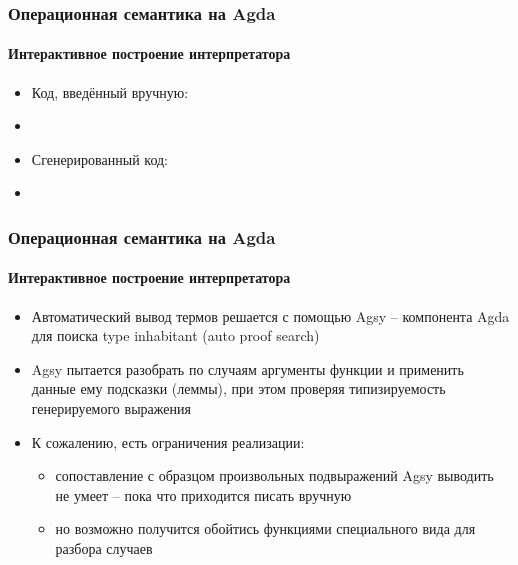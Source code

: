 \documentclass[10pt,pdf,hyperref={unicode}]{beamer}
\begin{document}
      \begin{frame}
         \frametitle{Операционная семантика на Agda}
         \framesubtitle{Интерактивное построение интерпретатора}
            \begin{itemize}
               \item Код, введённый вручную:
               \item[] \footnotesize{}
            \end{itemize} %
            \begin{itemize}
               \item Сгенерированный код:
               \item[] \footnotesize{}
            \end{itemize}
      \end{frame}

      \begin{frame}
         \frametitle{Операционная семантика на Agda}
         \framesubtitle{Интерактивное построение интерпретатора}
            \begin{itemize}
               \item Автоматический вывод термов решается с помощью Agsy --
                компонента Agda для поиска type inhabitant (auto proof search)
               \item Agsy пытается разобрать по случаям аргументы функции и применить
                данные ему подсказки (леммы), при этом проверяя типизируемость генерируемого выражения
               \item К сожалению, есть ограничения реализации:
                  \begin{itemize}
                     \item сопоставление с образцом произвольных подвыражений
                      Agsy выводить не умеет -- пока что приходится писать вручную
                     \item но возможно получится обойтись функциями специального вида
                      для разбора случаев
                  \end{itemize}
            \end{itemize}
      \end{frame}

      \newcommand{\seqssn}[0]{\tree{\rulens{p_1}{s_0}{s_1}}{}{\ruless{p_1 ; p_2}{s_0}{s_1}{p_2}}}
      \newcommand{\seqssj}[0]{\tree{\ruless{p_1}{s_0}{s_1}{p_1'}}{}
                                   {\ruless{p_1 ; p_2}{s_0}{s_1}{p_1' ; p_2}}}
      \newcommand{\iftruess}[0]{s[b] = true\Rightarrow\ruless{\mbox{if b then $p_1$ else $p_2$}}{s}{s}{p_1}}
\end{document}
